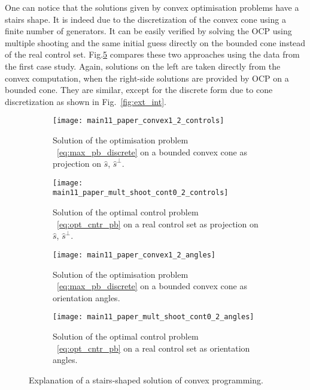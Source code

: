 \documentclass[AMA,STIX1COL]{WileyNJD-v2}
\newcommand{\uvect}[1]{\hat{#1}}
\begin{document}
One can notice that the solutions given by convex optimisation problems have a stairs shape. It is indeed due to the discretization of the convex cone using a finite number of generators. It can be easily verified by solving the \ac{OCP} using multiple shooting and the same initial guess directly on the bounded cone instead of the real control set. Fig.\ref{fig:stairs} compares these two approaches using the data from the first case study. Again, solutions on the left are taken directly from the convex computation, when the right-side solutions are provided by \ac{OCP} on a bounded cone. They are similar, except for the discrete form due to cone discretization as shown in Fig.~\ref{fig:ext_int}.

\begin{figure}
	\centering
	\begin{subfigure}[b]{0.45\textwidth}
		\centering
		\texttt{[image: main11\_paper\_convex1\_2\_controls]}
		\caption{Solution of the optimisation problem ~\eqref{eq:max_pb_discrete} on a bounded convex cone as projection on $\uvect{s}$, $\uvect{s}^{\perp}$.}
		\label{fig:sol_conv1_proj_rem}
	\end{subfigure}
	\hspace{1cm}
	\begin{subfigure}[b]{0.45\textwidth}
		\centering
		\texttt{[image: main11\_paper\_mult\_shoot\_cont0\_2\_controls]}
		\caption{Solution of the optimal control problem ~\eqref{eq:opt_cntr_pb} on a real control set  as projection on $\uvect{s}$, $\uvect{s}^{\perp}$.}
		\label{fig:sol_multi_shoot_proj_rem}
	\end{subfigure}
	\begin{subfigure}[t]{0.45\textwidth}
		\centering
		\texttt{[image: main11\_paper\_convex1\_2\_angles]}
		\caption{Solution of the optimisation problem ~\eqref{eq:max_pb_discrete} on a bounded convex cone as orientation angles.}
		\label{fig:sol_conv1_angles_rem}
	\end{subfigure}
	\hspace{1cm}
	\begin{subfigure}[t]{0.45\textwidth}
		\centering
		\texttt{[image: main11\_paper\_mult\_shoot\_cont0\_2\_angles]}
		\caption{Solution of the optimal control problem ~\eqref{eq:opt_cntr_pb} on a real control set as orientation angles.}
		\label{fig:sol_multi_shoot_angles_rem}
	\end{subfigure}
	\caption{Explanation of a stairs-shaped solution of convex programming.}
	\label{fig:stairs}
\end{figure}
\end{document}

